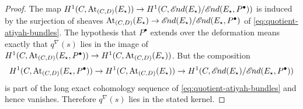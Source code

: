 \begin{proof}
  The map $H^1(C,\operatorname{At}_{(C,D)}(E_\star)) \to
  H^1(C,\mathscr{E}\kern -1pt nd(E_\star)/\mathscr{E}\kern -1pt nd(E_\star,P^\bullet))$ is induced by the
  surjection of sheaves $\operatorname{At}_{(C,D)}(E_\star) \to
  \mathscr{E}\kern -1pt nd(E_\star)/\mathscr{E}\kern -1pt nd(E_\star,P^\bullet)$ of
  \eqref{eq:quotient-atiyah-bundles}. The hypothesis that $P^\bullet$ extends over
  the deformation means exactly that $q^\nabla(s)$ lies in the image of
  $H^1(C,\operatorname{At}_{(C,D)}(E_\star,P^\bullet)) \to
  H^1(C,\operatorname{At}_{(C,D)}(E_\star))$. But the composition
  \[
    H^1(C,\operatorname{At}_{(C,D)}(E_\star,P^\bullet)) \to
    H^1(C,\operatorname{At}_{(C,D)}(E_\star)) \to
    H^1(C,\mathscr{E}\kern -1pt nd(E_\star)/\mathscr{E}\kern -1pt nd(E_\star,P^\bullet))
  \]
  is part of the long exact cohomology sequence of
  \eqref{eq:quotient-atiyah-bundles} and hence vanishes. Therefore $q^\nabla(s)$
  lies in the stated kernel.
\end{proof}
